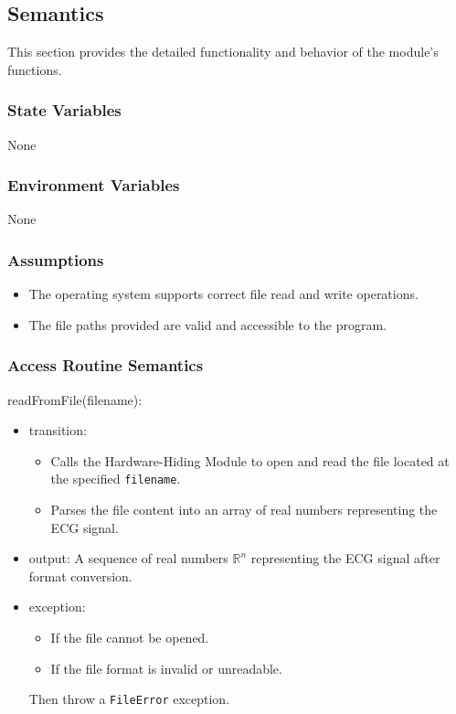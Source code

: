 \documentclass[12pt, titlepage]{article}
\begin{document}
\subsection{Semantics}

This section provides the detailed functionality and behavior of the module’s
functions.

\subsubsection{State Variables}

None

\subsubsection{Environment Variables}

None

\subsubsection{Assumptions}

\begin{itemize}
\item The operating system supports correct file read and write operations.
\item The file paths provided are valid and accessible to the program.
\end{itemize}

\subsubsection{Access Routine Semantics}

\noindent readFromFile(filename):
\begin{itemize}
\item transition: 
    \begin{itemize}
    \item Calls the Hardware-Hiding Module to open and read the file located at
    the specified \texttt{filename}.
    \item Parses the file content into an array of real numbers representing the
    ECG signal.
    \end{itemize}
\item output: A sequence of real numbers $\mathbb{R}^n$ representing the ECG
signal after format conversion.
\item exception: 
    \begin{itemize}
    \item If the file cannot be opened.
    \item If the file format is invalid or unreadable.
    \end{itemize}
    Then throw a \texttt{FileError} exception.
\end{itemize}
\end{document}
